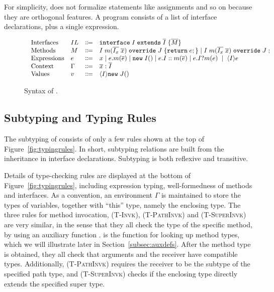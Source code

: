 For simplicity, \name{} does not formalize statements like assignments and so on because they are orthogonal features.
A program consists of a list of interface declarations, plus a single expression.

\begin{figure*}[t]
\saveSpaceFig
\begin{displaymath}
\begin{array}{l}
\begin{array}{llrl}
\text{Interfaces}   & IL & \Coloneqq & \texttt{interface} \; I \; \texttt{extends} \; \overline{I} \; {\{} \overline{M} {\}} \\
\text{Methods}      & M  & \Coloneqq & I \; m (\overline{I_x} \; \overline{x}) \; \texttt{override} \; J \; {\{} \texttt{return} \; e ; {\}}  \mid
									   I \; m (\overline{I_x} \; \overline{x}) \; \texttt{override} \; J \; ; \\
\text{Expressions}  & e  & \Coloneqq & x \mid
e.m(\overline{e}) \mid
\texttt{new} \; I() \mid
e.I::m(\overline{e}) \mid
e.I?m(e) \; \mid \; \langle I \rangle e \\
\text{Context}      & \Gamma & \Coloneqq & \overline{x}:\overline{I} \\
\text{Values}       & v & \Coloneqq & \langle I \rangle \texttt{new} \; J() \\
\end{array}
\end{array}
\end{displaymath}
\caption{Syntax of \name{}.}\label{fig:syntax}
\saveSpaceFig
\end{figure*}

\subsection{Subtyping and Typing Rules}
The subtyping of \MIM{} consists of only a few rules shown at the top of Figure~\ref{fig:typingrules}.
In short, subtyping relations are built from the inheritance in interface
declarations. Subtyping is both reflexive and transitive.

Details of type-checking rules are displayed at the bottom of Figure~\ref{fig:typingrules}, including expression
typing, well-formedness of methods and interfaces. As a convention, an environment
$\Gamma$ is maintained to store the types of variables, together with ``this'' type, namely
the enclosing type. The three rules for method invocation, \textsc{(T-Invk)}, \textsc{(T-PathInvk)} and \textsc{(T-SuperInvk)}
are very similar, in the sense that they all check the type of the specific method, by using
an auxiliary function \mtype. \mtype{} is the function for looking up method types, which we will
illustrate later in Section~\ref{subsec:auxdefs}. After the method type is obtained, they all check that arguments and the receiver
have compatible types. Additionally, \textsc{(T-PathInvk)} requires the receiver to be the subtype of the specified
path type, and \textsc{(T-SuperInvk)} checks if the enclosing type directly extends the specified super type.


